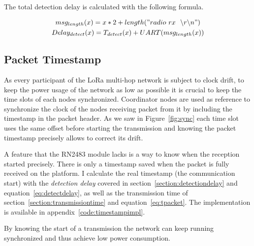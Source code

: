 The total detection delay is calculated with the following formula.

\begin{gather}
  msg_{length}(x) = x * 2 + length("radio~rx~~\backslash r \backslash n") \\
  \label{eq:detectdelay}
  Delay_{detect}(x) = T_{detect}(x) + UART(msg_{length}(x))
\end{gather}

\subsection{Packet Timestamp}

As every participant of the LoRa multi-hop network is subject to clock drift,
to keep the power usage of the network as low as possible it is
crucial to keep the time slots of each nodes synchronized.
Coordinator nodes are used as reference to synchronize the clock of the nodes
receiving packet from it by including the timestamp in the packet header.
As we saw in Figure~\ref{fig:sync} each time slot uses the same offset before
starting the transmission and knowing the packet timestamp precisely allows
to correct its drift.

A feature that the RN2483 module lacks is a way to know when the reception started
precisely.
There is only a timestamp saved when the packet is fully received on the platform.
I calculate the real timestamp (the communication start) with the
\emph{detection delay} covered in section~\ref{section:detectiondelay} and
equation~\ref{eq:detectdelay}, as well as the transmission time of
section~\ref{section:transmissiontime} and equation~\ref{eq:tpacket}.
The implementation is available in appendix~\ref{code:timestampimpl}.

By knowing the start of a transmission the network can keep running synchronized
and thus achieve low power consumption.



